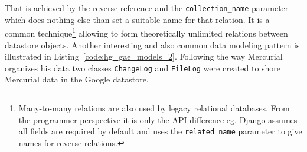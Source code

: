 
That is achieved by the reverse reference and the \texttt{collection\_name} parameter which does nothing else than set a suitable name for that relation. It is a common technique\footnote{Many-to-many relations are also used by legacy relational databases. From the programmer perspective it is only the API difference eg. Django assumes all fields are required by default and uses the \texttt{related\_name} parameter to give names for reverse relations.} allowing to form theoretically unlimited relations between datastore objects. Another interesting and also common data modeling pattern is illustrated in Listing~\ref{code:hg_gae_models_2}. Following the way Mercurial organizes his data two classes \texttt{ChangeLog} and \texttt{FileLog} were created to shore Mercurial data in the Google datastore.\\

